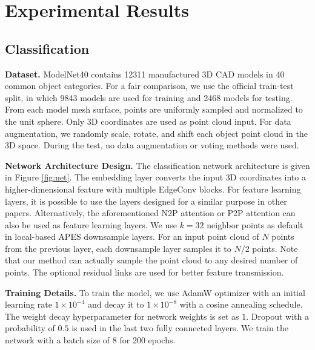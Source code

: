 \documentclass[10pt,twocolumn,letterpaper]{article}
\begin{document}
\section{Experimental Results}
\label{sec:experiments}


\subsection{Classification}
\label{sec:cls}
\textbf{Dataset.}
ModelNet40 \cite{Wu20153DSA} contains 12311 manufactured 3D CAD models in 40 common object categories. For a fair comparison, we use the official train-test split, in which 9843 models are used for training and 2468 models for testing. From each model mesh surface, points are uniformly sampled and normalized to the unit sphere. Only 3D coordinates are used as point cloud input. For data augmentation, we randomly scale, rotate, and shift each object point cloud in the 3D space.
During the test, no data augmentation or voting methods were used.

\textbf{Network Architecture Design.}
The classification network architecture is given in Figure \ref{fig:net}.
The embedding layer converts the input 3D coordinates into a higher-dimensional feature with multiple EdgeConv blocks.
For feature learning layers, it is possible to use the layers designed for a similar purpose in other papers.
Alternatively, the aforementioned N2P attention or P2P attention can also be used as feature learning layers. 
We use $k=32$ neighbor points as default in local-based APES downsample layers. For an input point cloud of $N$ points from the previous layer, each downsample layer samples it to $N/2$ points. Note that our method can actually sample the point cloud to any desired number of points. The optional residual links are used for better feature transmission.

\textbf{Training Details.}
To train the model, we use AdamW optimizer with an initial
learning rate $1\times 10^{-4}$ and decay it to $1\times 10^{-8}$ with a cosine annealing schedule. 
The weight decay hyperparameter for network weights is set as $1$. Dropout with a probability of $0.5$ is used in the last two fully connected layers. 
We train the network with a batch size of 8 for 200 epochs.
\end{document}
